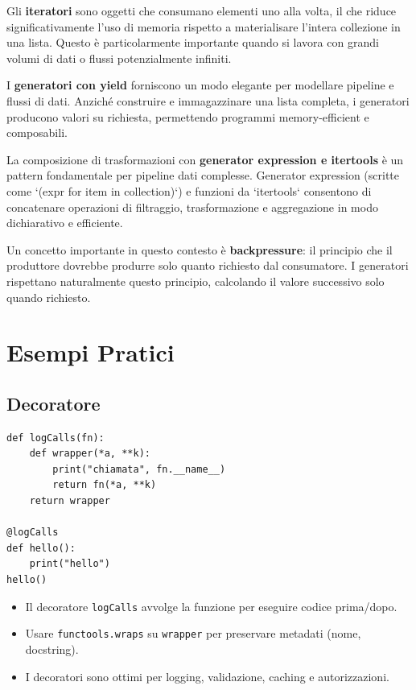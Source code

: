 \begin{tcolorbox}[title=Iterazione e valutazione lazy]
Gli \textbf{iteratori} sono oggetti che consumano elementi uno alla volta, il che riduce significativamente l'uso di memoria rispetto a materialisare l'intera collezione in una lista. Questo è particolarmente importante quando si lavora con grandi volumi di dati o flussi potenzialmente infiniti.

I \textbf{generatori con yield} forniscono un modo elegante per modellare pipeline e flussi di dati. Anziché construire e immagazzinare una lista completa, i generatori producono valori su richiesta, permettendo programmi memory-efficient e composabili.

La composizione di trasformazioni con \textbf{generator expression e itertools} è un pattern fondamentale per pipeline dati complesse. Generator expression (scritte come `(expr for item in collection)`) e funzioni da `itertools` consentono di concatenare operazioni di filtraggio, trasformazione e aggregazione in modo dichiarativo e efficiente.

Un concetto importante in questo contesto è \textbf{backpressure}: il principio che il produttore dovrebbe produrre solo quanto richiesto dal consumatore. I generatori rispettano naturalmente questo principio, calcolando il valore successivo solo quando richiesto.
\end{tcolorbox}

\section{Esempi Pratici}
\subsection{Decoratore}
\begin{lstlisting}
def logCalls(fn):
    def wrapper(*a, **k):
        print("chiamata", fn.__name__)
        return fn(*a, **k)
    return wrapper

@logCalls
def hello():
    print("hello")
hello()
\end{lstlisting}

\begin{tcolorbox}[title=Spiegazione]
\begin{itemize}
  \item Il decoratore \texttt{logCalls} avvolge la funzione per eseguire codice prima/dopo.
  \item Usare \verb|functools.wraps| su \texttt{wrapper} per preservare metadati (nome, docstring).
  \item I decoratori sono ottimi per logging, validazione, caching e autorizzazioni.
\end{itemize}
\end{tcolorbox}

